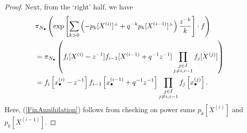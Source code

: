\documentclass[10pt,a4paper]{amsart}
\newcommand{\La}{\Lambda}
\newcommand{\Pol}{\mathrm{Pol}}
\newcommand{\nd}{n_\bullet}
\newcommand{\zd}{z_\bullet}
\begin{document}
\begin{proof}
Next, from the `right' half, we have
\begin{align}
\nonumber
&\pi_{N_\bullet}\left( \exp\left[\sum_{k>0}\left( -p_k[X^{(i)}]^\perp+q^{-k}p_k[X^{(i-1)}]^\perp \right)\frac{z^{-k}}{k}  \right]\cdot f \right)\\
\label{FinAnnihilation}
&=
\pi_{N_\bullet}\left(f_i[X^{(i)}-z^{-1}]f_{i-1}[X^{(i-1)}+q^{-1}z^{-1}]\prod_{\substack{j\in I\\j\not=i,i-1}} f_j[X^{(j)}] \right)\\
\nonumber
&= f_i\left[x_{\bullet}^{(i)}-z^{-1}\right]f_{i-1}\left[x_{\bullet}^{(i-1)}+q^{-1}z^{-1}\right]
\prod_{\substack{j\in I\\j\not=i,i-1}} f_j\left[x_{\bullet}^{(j)}\right].\notag
\end{align}
Here, (\ref{FinAnnihilation}) follows from checking on power sums $p_k[X^{(i)}]$ and $p_k[X^{(i-1)}]$.
%

\end{proof}
\end{document}
